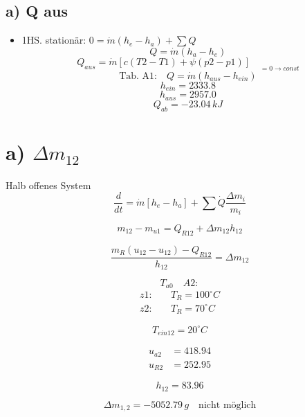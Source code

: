\subsection*{a) Q aus}

\begin{itemize}
    \item 1HS. stationär: \(0 = \dot{m} (h_e - h_a) + \sum Q\)
    \[
    Q = \dot{m} (h_a - h_e)
    \]
    \[
    Q_{aus} = \dot{m} \left[ c (T2 - T1) + \psi (p2 - p1) \right] \quad \underset{=0 \rightarrow const}{}
    \]
    \[
    \text{Tab. A1:} \quad Q = \dot{m} (h_{aus} - h_{ein})
    \]
    \[
    h_{ein} = 2333.8
    \]
    \[
    h_{aus} = 2957.0
    \]
    \[
    Q_{ab} = -23.04 \, kJ
    \]
\end{itemize}

\section*{a) $\Delta m_{12}$}

Halb offenes System
\[
\frac{d}{dt} = \dot{m} [h_{e} - h_{a}] + \sum \dot{Q} \frac{\Delta m_{i}}{m_{i}}
\]

\[
m_{12} - m_{u1} = Q_{R12} + \Delta m_{12} h_{12}
\]

\[
\frac{m_{R} (u_{12} - u_{12}) - Q_{R12}}{h_{12}} = \Delta m_{12}
\]

\[
T_{a0} \quad A2:
\]
\[
\begin{aligned}
z1: & \quad T_{R} = 100^\circ C \\
z2: & \quad T_{R} = 70^\circ C
\end{aligned}
\]

\[
T_{ein12} = 20^\circ C
\]

\[
\begin{aligned}
u_{a2} & = 418.94 \\
u_{R2} & = 252.95
\end{aligned}
\]

\[
h_{12} = 83.96
\]

\[
\Delta m_{1,2} = -5052.79 \, g \quad \text{nicht möglich}
\]